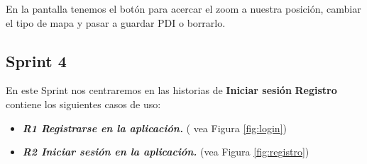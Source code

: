 En la pantalla tenemos el botón para acercar el zoom a nuestra posición, cambiar el tipo de mapa y pasar a guardar PDI o borrarlo.

\subsection{Sprint 4}

En este Sprint nos centraremos en las historias de  \textbf{Iniciar sesión }
\textbf{Registro} contiene los siguientes casos de uso:



\begin{itemize}
\item\textbf{ \textit{R1  Registrarse en la aplicación.}}  ( vea Figura \ref{fig:login})
\item \textbf{\textit{R2 Iniciar sesión en la aplicación. }}  (vea Figura \ref{fig:registro})

\end{itemize} 
